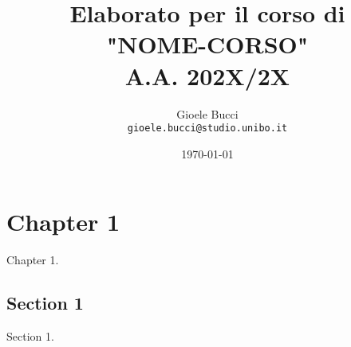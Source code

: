 \documentclass[a4paper,12pt]{report}
\title{\textbf{Elaborato per il corso di\\"NOME-CORSO"}
\\A.A. 202X/2X}
\author{Gioele Bucci
\\ \texttt{gioele.bucci@studio.unibo.it}}
\date{\today}
\begin{document}
\maketitle

\tableofcontents

\chapter{Chapter 1}

Chapter 1.

\section{Section 1}

Section 1.
\end{document}

